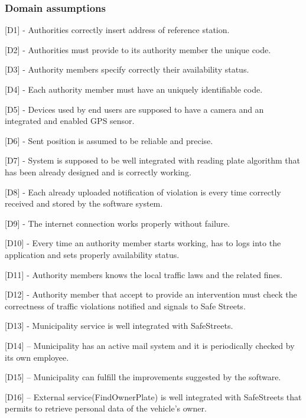 \documentclass[12pt]{article}
\begin{document}
\subsubsection{Domain assumptions}
\begin{flushleft}

[D1] - Authorities correctly insert address of reference station.
\vspace{2mm}

[D2] - Authorities must provide to its authority member the unique code.
\vspace{2mm}

[D3] - Authority members specify correctly their availability status.
\vspace{2mm}

[D4] - Each authority member must have an uniquely identifiable code. 
\vspace{2mm}

[D5] - Devices used by end users are supposed to have a camera and an integrated and enabled GPS sensor.
\vspace{2mm}

[D6] - Sent position is assumed to be reliable and precise.
\vspace{2mm}

[D7] - System is supposed to be well integrated with reading plate algorithm that has been already designed and is correctly working.
\vspace{2mm}

[D8] - Each already uploaded notification of violation is every time correctly received and stored by the software system.
\vspace{2mm}

[D9] - The internet connection works properly without failure.
\vspace{2mm}

[D10] - Every time an authority member starts working, has to logs into the application and sets properly availability status.
\vspace{2mm}

[D11] - Authority members knows the local traffic laws and the related fines.\vspace{2mm}

[D12] - Authority member that accept to provide an intervention must check the correctness of traffic violations notified and signals to Safe Streets.
\vspace{2mm}

[D13] - Municipality service is well integrated with SafeStreets.
\vspace{2mm}

[D14] – Municipality has an active mail system and it is periodically checked by its own employee.
\vspace{2mm}

[D15] – Municipality can fulfill the improvements suggested by the software.
\vspace{2mm}

[D16] – External service(FindOwnerPlate) is well integrated with SafeStreets that permits to retrieve personal data of the vehicle’s owner.
\vspace{2mm}

\end{flushleft}
\end{document}
